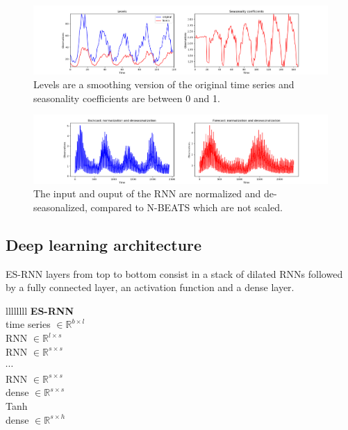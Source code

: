 \documentclass{article}
\begin{document}
 \begin{figure}[ht]
\centering
	\includegraphics[width=0.9\columnwidth]{H344_levels_seasonalities.png} 
\caption{Levels are a smoothing version of the original time series and \\ seasonality coefficients are between 0 and 1.}
\label{fig:levelsseasonality}
\end{figure}

\begin{figure}[ht]
\centering
	\includegraphics[width=0.9\columnwidth]{H344_windows.png} 
\caption{The input and ouput of the RNN are normalized and de-seasonalized, compared to N-BEATS which are not scaled.}
\label{fig:normalizeddeseasonalized}
\end{figure}

\subsection{Deep learning architecture}

ES-RNN layers from top to bottom consist in a stack of dilated RNNs followed by a fully connected layer, an activation function and a dense layer.

 \begin{table}[!ht]
	\centering
	\begin{tabular}{llllllll} 
		\midrule
			 {\textbf{ES-RNN}} \\
		\midrule
			 {time series $\in \mathbb{R}^{b \times l}$} \\
		\midrule
			 {RNN  $\in \mathbb{R}^{l \times s}$} \\		
		\midrule
			 {RNN  $\in \mathbb{R}^{s \times s}$} \\		
		\midrule
			 {$\cdots$} \\		
		\midrule
			 {RNN  $\in \mathbb{R}^{s \times s}$} \\		
		\midrule
			 {dense  $\in \mathbb{R}^{s \times s}$} \\		
		\midrule
			 {Tanh} \\		
		\midrule
			 {dense  $\in \mathbb{R}^{s \times h}$} \\		
		\midrule
	\end{tabular}
	\caption{ES-RNN architecture. Let $b$ the batch size, l the length of the time series, s the embedding dimensional state size and h the length of the prediction.}
	\label{tab:esrnnarchitecture}
\end{table}
\end{document}
